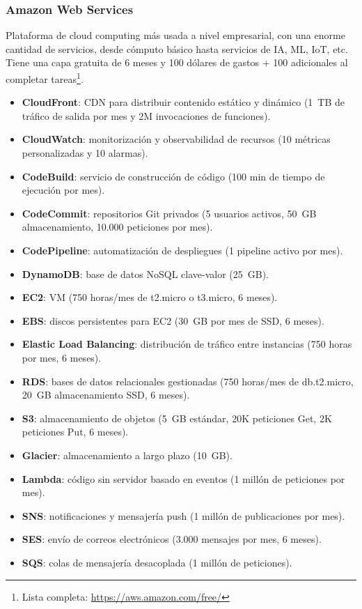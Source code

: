\subsubsection*{Amazon Web Services}

Plataforma de cloud computing más usada a nivel empresarial, con una enorme cantidad de servicios, desde cómputo básico hasta servicios de IA, ML, IoT, etc. Tiene una capa gratuita de 6 meses y 100 dólares de gastos + 100 adicionales al completar tareas\footnote{Lista completa: \url{https://aws.amazon.com/free/}}.

\begin{itemize}
	\item \textbf{CloudFront}: CDN para distribuir contenido estático y dinámico (1~TB de tráfico de salida por mes y 2M invocaciones de funciones).
	\item \textbf{CloudWatch}: monitorización y observabilidad de recursos (10 métricas personalizadas y 10 alarmas).
	\item \textbf{CodeBuild}: servicio de construcción de código (100 min de tiempo de ejecución por mes).
	\item \textbf{CodeCommit}: repositorios Git privados (5 usuarios activos, 50~GB almacenamiento, 10.000 peticiones por mes).
	\item \textbf{CodePipeline}: automatización de despliegues (1 pipeline activo por mes).
	\item \textbf{DynamoDB}: base de datos NoSQL clave-valor (25~GB).
	\item \textbf{EC2}: VM (750 horas/mes de t2.micro o t3.micro, 6 meses).
	\item \textbf{EBS}: discos persistentes para EC2 (30~GB por mes de SSD, 6 meses).
	\item \textbf{Elastic Load Balancing}: distribución de tráfico entre instancias (750 horas por mes, 6 meses).
	\item \textbf{RDS}: bases de datos relacionales gestionadas (750 horas/mes de db.t2.micro, 20~GB almacenamiento SSD, 6 meses).
	\item \textbf{S3}: almacenamiento de objetos (5~GB estándar, 20K peticiones Get, 2K peticiones Put, 6 meses).
	\item \textbf{Glacier}: almacenamiento a largo plazo (10~GB).
	\item \textbf{Lambda}: código sin servidor basado en eventos (1 millón de peticiones por mes).
	\item \textbf{SNS}: notificaciones y mensajería push (1 millón de publicaciones por mes).
	\item \textbf{SES}: envío de correos electrónicos (3.000 mensajes por mes, 6 meses).
	\item \textbf{SQS}: colas de mensajería desacoplada (1 millón de peticiones).
\end{itemize}

